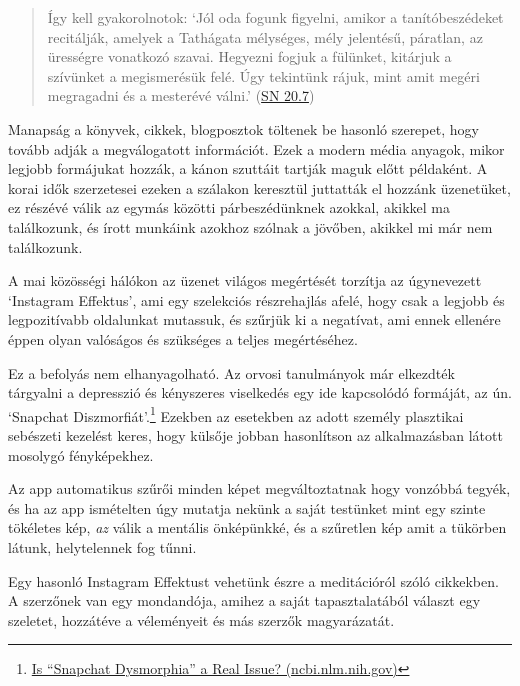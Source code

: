 \begin{quote}
Így kell gyakorolnotok: `Jól oda fogunk figyelni, amikor a
tanítóbeszédeket recitálják, amelyek a Tathágata mélységes, mély
jelentésű, páratlan, az ürességre vonatkozó szavai. Hegyezni fogjuk a
fülünket, kitárjuk a szívünket a megismerésük felé. Úgy tekintünk rájuk,
mint amit megéri megragadni és a mesterévé válni.'
(\href{https://a-buddha-ujja.hu/sn-20.7/hu/fenyvesi-robert}{SN 20.7})
\end{quote}

Manapság a könyvek, cikkek, blogposztok töltenek be hasonló szerepet,
hogy tovább adják a megválogatott információt. Ezek a modern média
anyagok, mikor legjobb formájukat hozzák, a kánon szuttáit tartják maguk
előtt példaként. A korai idők szerzetesei ezeken a szálakon keresztül
juttatták el hozzánk üzenetüket, ez részévé válik az egymás közötti
párbeszédünknek azokkal, akikkel ma találkozunk, és írott munkáink
azokhoz szólnak a jövőben, akikkel mi már nem találkozunk.

\clearpage

\vspace*{-\baselineskip}


A mai közösségi hálókon az üzenet világos megértését torzítja az
úgynevezett `Instagram Effektus', ami egy szelekciós részrehajlás afelé,
hogy csak a legjobb és legpozitívabb oldalunkat mutassuk, és szűrjük ki
a negatívat, ami ennek ellenére éppen olyan valóságos és szükséges a
teljes megértéséhez.

Ez a befolyás nem elhanyagolható. Az orvosi tanulmányok már elkezdték
tárgyalni a depresszió és kényszeres viselkedés egy ide kapcsolódó
formáját, az ún. `Snapchat Diszmorfiát'.\footnote{\href{https://www.ncbi.nlm.nih.gov/pmc/articles/PMC5933578/}{Is
  ``Snapchat Dysmorphia'' a Real Issue? (ncbi.nlm.nih.gov)}} Ezekben az
esetekben az adott személy plasztikai sebészeti kezelést keres, hogy
külsője jobban hasonlítson az alkalmazásban látott mosolygó
fényképekhez.

Az app automatikus szűrői minden képet megváltoztatnak hogy vonzóbbá
tegyék, és ha az app ismételten úgy mutatja nekünk a saját testünket
mint egy szinte tökéletes kép, \emph{az} válik a mentális önképünkké, és
a szűretlen kép amit a tükörben látunk, helytelennek fog tűnni.

Egy hasonló Instagram Effektust vehetünk észre a meditációról szóló
cikkekben. A szerzőnek van egy mondandója, amihez a saját
tapasztalatából választ egy szeletet, hozzátéve a véleményeit és más
szerzők magyarázatát.

